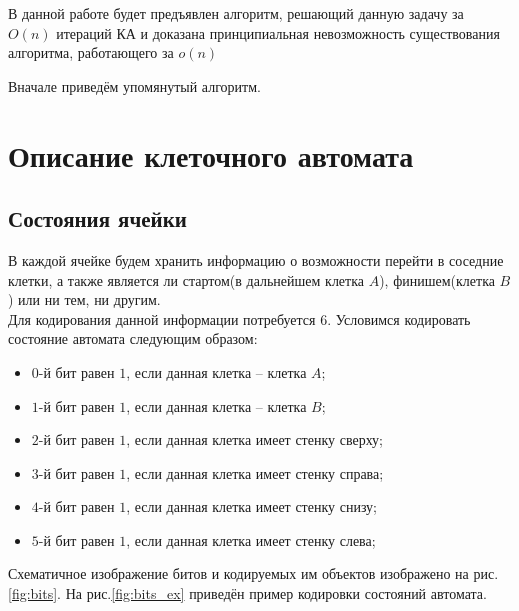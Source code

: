\documentclass[12pt]{article}
\begin{document}
\bigskip
 
 В данной работе будет предъявлен алгоритм, решающий данную задачу за $O(n)$ итераций КА и доказана принципиальная невозможность существования алгоритма, работающего за $o(n)$
 
Вначале приведём упомянутый алгоритм.
 
\section*{Описание клеточного автомата}
\subsection*{Состояния ячейки}
В каждой ячейке будем хранить информацию о возможности перейти в соседние клетки, а также является ли стартом(в дальнейшем клетка $A$), финишем(клетка $B$) или ни тем, ни другим.\\

Для кодирования данной информации потребуется $6$. Условимся кодировать состояние автомата следующим образом:

\begin{itemize}
\item $0$-й бит равен $1$, если данная клетка -- клетка $A$;
\item $1$-й бит равен $1$, если данная клетка -- клетка $B$;
\item $2$-й бит равен $1$, если данная клетка имеет стенку сверху;
\item $3$-й бит равен $1$, если данная клетка имеет стенку справа;
\item $4$-й бит равен $1$, если данная клетка имеет стенку снизу;
\item $5$-й бит равен $1$, если данная клетка имеет стенку слева;
\end{itemize}

Схематичное изображение битов и кодируемых им объектов изображено на рис.\ref{fig:bits}. На рис.\ref{fig:bits_ex} приведён пример кодировки состояний автомата.
\end{document}
